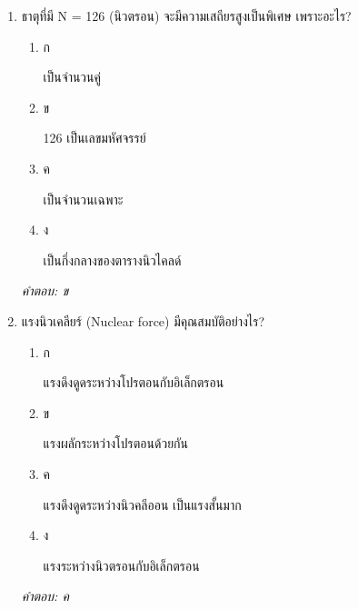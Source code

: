 \documentclass[12pt]{article}
\begin{document}
\begin{enumerate}[label=\arabic*., itemsep=0.5\baselineskip, topsep=0.5\baselineskip, leftmargin=*]
\item ธาตุที่มี N = 126 (นิวตรอน) จะมีความเสถียรสูงเป็นพิเศษ เพราะอะไร?
\begin{enumerate}[label=\alph*)., itemsep=0.3\baselineskip, topsep=0.3\baselineskip]
\item ก\ 
\begin{minipage}[t]{0.9\linewidth}
\raggedright เป็นจำนวนคู่
\end{minipage}
\item ข\ 
\begin{minipage}[t]{0.9\linewidth}
\raggedright 126 เป็นเลขมหัศจรรย์
\end{minipage}
\item ค\ 
\begin{minipage}[t]{0.9\linewidth}
\raggedright เป็นจำนวนเฉพาะ
\end{minipage}
\item ง\ 
\begin{minipage}[t]{0.9\linewidth}
\raggedright เป็นกึ่งกลางของตารางนิวไคลด์
\end{minipage}
\end{enumerate}
\vspace{-0.3\baselineskip}
\begin{small}
\textit{คำตอบ: ข}
\end{small}

\item แรงนิวเคลียร์ (Nuclear force) มีคุณสมบัติอย่างไร?
\begin{enumerate}[label=\alph*)., itemsep=0.3\baselineskip, topsep=0.3\baselineskip]
\item ก\ 
\begin{minipage}[t]{0.9\linewidth}
\raggedright แรงดึงดูดระหว่างโปรตอนกับอิเล็กตรอน
\end{minipage}
\item ข\ 
\begin{minipage}[t]{0.9\linewidth}
\raggedright แรงผลักระหว่างโปรตอนด้วยกัน
\end{minipage}
\item ค\ 
\begin{minipage}[t]{0.9\linewidth}
\raggedright แรงดึงดูดระหว่างนิวคลีออน เป็นแรงสั้นมาก
\end{minipage}
\item ง\ 
\begin{minipage}[t]{0.9\linewidth}
\raggedright แรงระหว่างนิวตรอนกับอิเล็กตรอน
\end{minipage}
\end{enumerate}
\vspace{-0.3\baselineskip}
\begin{small}
\textit{คำตอบ: ค}
\end{small}


\end{enumerate}
\end{document}
